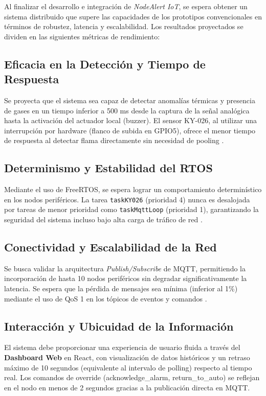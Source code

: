 
Al finalizar el desarrollo e integración de \textit{NodeAlert IoT}, se espera obtener un sistema distribuido que supere las capacidades de los prototipos convencionales en términos de robustez, latencia y escalabilidad. Los resultados proyectados se dividen en las siguientes métricas de rendimiento:

\subsection{Eficacia en la Detección y Tiempo de Respuesta}
Se proyecta que el sistema sea capaz de detectar anomalías térmicas y presencia de gases en un tiempo inferior a 500 ms desde la captura de la señal analógica hasta la activación del actuador local (buzzer). El sensor KY-026, al utilizar una interrupción por hardware (flanco de subida en GPIO5), ofrece el menor tiempo de respuesta al detectar flama directamente sin necesidad de pooling \citep{alexander2006}.

\subsection{Determinismo y Estabilidad del RTOS}
Mediante el uso de FreeRTOS, se espera lograr un comportamiento determinístico en los nodos periféricos. La tarea \texttt{taskKY026} (prioridad 4) nunca es desalojada por tareas de menor prioridad como \texttt{taskMqttLoop} (prioridad 1), garantizando la seguridad del sistema incluso bajo alta carga de tráfico de red \citep{valvano2014volume1}.

\subsection{Conectividad y Escalabilidad de la Red}
Se busca validar la arquitectura \textit{Publish/Subscribe} de MQTT, permitiendo la incorporación de hasta 10 nodos periféricos sin degradar significativamente la latencia. Se espera que la pérdida de mensajes sea mínima (inferior al 1\%) mediante el uso de QoS 1 en los tópicos de eventos y comandos \citep{valvano2014volume2}.

\subsection{Interacción y Ubicuidad de la Información}
El sistema debe proporcionar una experiencia de usuario fluida a través del \textbf{Dashboard Web} en React, con visualización de datos históricos y un retraso máximo de 10 segundos (equivalente al intervalo de polling) respecto al tiempo real. Los comandos de override (acknowledge\_alarm, return\_to\_auto) se reflejan en el nodo en menos de 2 segundos gracias a la publicación directa en MQTT.

